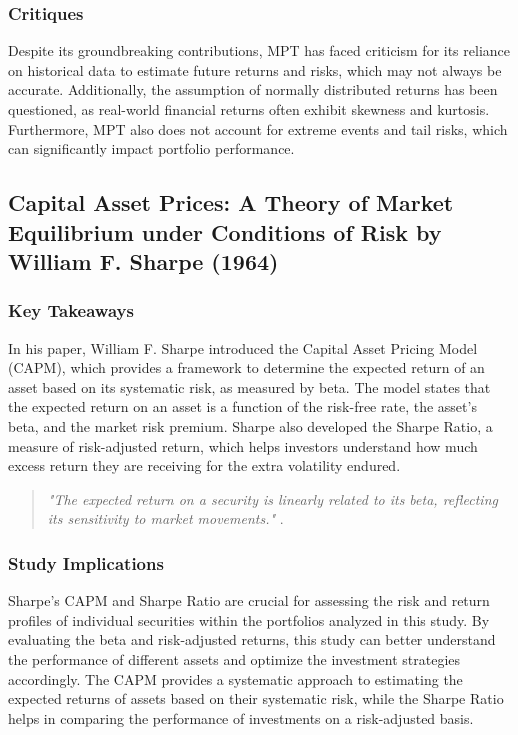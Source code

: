 \subsubsection{Critiques}
Despite its groundbreaking contributions, MPT has faced criticism for its reliance on historical data to estimate future returns and risks, which may not always be accurate. Additionally, the assumption of normally distributed returns has been questioned, as real-world financial returns often exhibit skewness and kurtosis. Furthermore, MPT also does not account for extreme events and tail risks, which can significantly impact portfolio performance.





\subsection{Capital Asset Prices: A Theory of Market Equilibrium under Conditions of Risk by William F. Sharpe (1964)}

\subsubsection{Key Takeaways}
In his paper, William F. Sharpe introduced the Capital Asset Pricing Model (CAPM), which provides a framework to determine the expected return of an asset based on its systematic risk, as measured by beta. The model states that the expected return on an asset is a function of the risk-free rate, the asset's beta, and the market risk premium. Sharpe also developed the Sharpe Ratio, a measure of risk-adjusted return, which helps investors understand how much excess return they are receiving for the extra volatility endured.

\begin{quote}
\textit{"The expected return on a security is linearly related to its beta, reflecting its sensitivity to market movements."} \citep{sharpe1964capital}.
\end{quote}


\subsubsection{Study Implications}
Sharpe's CAPM and Sharpe Ratio are crucial for assessing the risk and return profiles of individual securities within the portfolios analyzed in this study. By evaluating the beta and risk-adjusted returns, this study can better understand the performance of different assets and optimize the investment strategies accordingly. The CAPM provides a systematic approach to estimating the expected returns of assets based on their systematic risk, while the Sharpe Ratio helps in comparing the performance of investments on a risk-adjusted basis.

